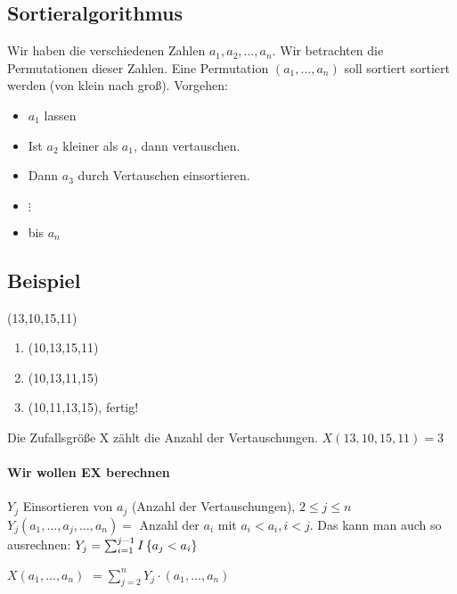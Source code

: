 \renewcommand{\ldate}{2015-11-03}

\subsection{Sortieralgorithmus}
Wir haben die verschiedenen Zahlen $a_1, a_2, ..., a_n$. Wir betrachten die Permutationen dieser Zahlen. Eine Permutation $(a_1, ..., a_n)$ soll sortiert sortiert werden (von klein nach groß). Vorgehen:\\

\begin{itemize}
\item $a_1$ lassen
\item Ist $a_2$ kleiner als $a_1$, dann vertauschen.
\item Dann $a_3$ durch Vertauschen einsortieren. 
\item $\vdots$
\item bis $a_n$
\end{itemize}

\subsection{Beispiel}
(13,10,15,11) 
\begin{enumerate}
\item (10,13,15,11)
\item (10,13,11,15)
\item (10,11,13,15), fertig!
\end{enumerate}

Die Zufallsgröße X zählt die Anzahl der Vertauschungen. 
$X(13,10,15,11) = 3$

\paragraph{Wir wollen EX berechnen}
$Y_j$ Einsortieren von $a_j$ (Anzahl der Vertauschungen), $2\leq j \leq n$\\
$Y_j(a_1,...,a_j,...,a_n) = $ 
Anzahl der $a_i$ mit $a_i < a_i, i < j $. Das kann man auch so ausrechnen: 
$Y_j = \sum_{i=1}^{j-1} I \left\lbrace a_j < a_i \right\rbrace $ 

$X(a_1,...,a_n)$
$=\sum_{j=2}^{n} Y_j \cdot (a_1, ..., a_n)$ 

